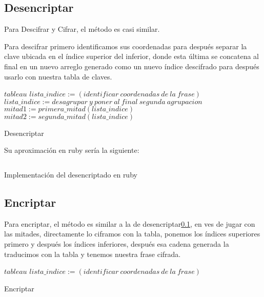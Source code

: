 \documentclass[onecolumn]{IEEEtran}
\begin{document}
\newpage{}
\subsection{Desencriptar}\label{sec:desencriptar}


Para Descifrar y Cifrar, el método es casi similar.

Para descifrar primero identificamos
sus coordenadas para después separar la clave ubicada en el
índice superior del inferior, donde esta última se concatena al final
en un nuevo arreglo generado como un nuevo índice descifrado para después
usarlo con nuestra tabla de claves.
\begin{algorithm}
  \SetAlgoLined{}
  $tableau$\;
  $lista\_indice:=(identificar\ coordenadas\ de\ la\ frase)$\;
  $lista\_indice:=desagrupar\ y\ poner\ al\ final\ segunda\ agrupacion$\;
  $mitad1:=primera\_mitad(lista\_indice)$\;
  $mitad2:=segunda\_mitad(lista\_indice)$\;


  \caption{Desencriptar}\label{alg:desc}
\end{algorithm}

Su aproximación en ruby sería la siguiente:
\begin{code}
  \inputminted[firstline=23, lastline=37]{ruby}{../program.rb}
  \caption{Implementación del desencriptado en ruby}\label{sec:generar-la-tabla-2}
\end{code}
\newpage{}
\subsection{Encriptar}\label{sec:encriptar}

Para encriptar, el método es similar a la de
desencriptar\ref{sec:desencriptar}, en ves de jugar con las mitades,
directamente lo ciframos con la tabla, ponemos los índices superiores primero
y después los índices inferiores, después esa cadena generada la traducimos con
la tabla y tenemos nuestra frase cifrada.
\begin{algorithm}
  \SetAlgoLined{}
  $tableau$\;
  $lista\_indice:=(identificar\ coordenadas\ de\ la\ frase)$\;



  \caption{Encriptar}\label{alg:enc}
\end{algorithm}
\end{document}
